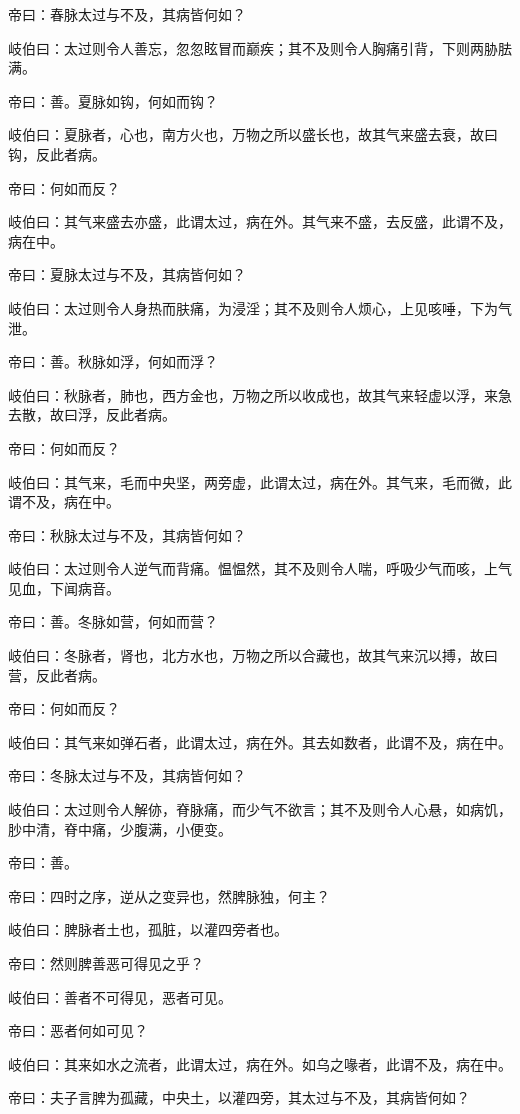 \documentclass{article}%
\begin{document}
帝曰：春脉太过与不及，其病皆何如？

岐伯曰：太过则令人善忘，忽忽眩冒而巅疾；其不及则令人胸痛引背，下则两胁胠满。

帝曰：善。夏脉如钩，何如而钩？

岐伯曰：夏脉者，心也，南方火也，万物之所以盛长也，故其气来盛去衰，故曰钩，反此者病。

帝曰：何如而反？

岐伯曰：其气来盛去亦盛，此谓太过，病在外。其气来不盛，去反盛，此谓不及，病在中。

帝曰：夏脉太过与不及，其病皆何如？

岐伯曰：太过则令人身热而肤痛，为浸淫；其不及则令人烦心，上见咳唾，下为气泄。

帝曰：善。秋脉如浮，何如而浮？

岐伯曰：秋脉者，肺也，西方金也，万物之所以收成也，故其气来轻虚以浮，来急去散，故曰浮，反此者病。

帝曰：何如而反？

岐伯曰：其气来，毛而中央坚，两旁虚，此谓太过，病在外。其气来，毛而微，此谓不及，病在中。

帝曰：秋脉太过与不及，其病皆何如？

岐伯曰：太过则令人逆气而背痛。愠愠然，其不及则令人喘，呼吸少气而咳，上气见血，下闻病音。

帝曰：善。冬脉如营，何如而营？

岐伯曰：冬脉者，肾也，北方水也，万物之所以合藏也，故其气来沉以搏，故曰营，反此者病。

帝曰：何如而反？

岐伯曰：其气来如弹石者，此谓太过，病在外。其去如数者，此谓不及，病在中。

帝曰：冬脉太过与不及，其病皆何如？

岐伯曰：太过则令人解㑊，脊脉痛，而少气不欲言；其不及则令人心悬，如病饥，䏚中清，脊中痛，少腹满，小便变。

帝曰：善。

帝曰：四时之序，逆从之变异也，然脾脉独，何主？

岐伯曰：脾脉者土也，孤脏，以灌四旁者也。

帝曰：然则脾善恶可得见之乎？

岐伯曰：善者不可得见，恶者可见。

帝曰：恶者何如可见？

岐伯曰：其来如水之流者，此谓太过，病在外。如乌之喙者，此谓不及，病在中。

帝曰：夫子言脾为孤藏，中央土，以灌四旁，其太过与不及，其病皆何如？
\end{document}
